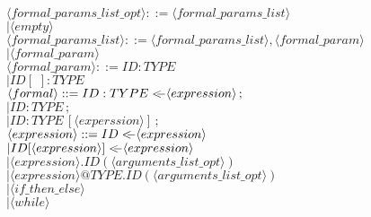 \documentclass[11pt]{article}
\begin{document}
\begin{enumerate}
\color{black}
$\langle formal\_params\_list\_opt\rangle  ::= \langle formal\_params\_list\rangle$\\
                          \hspace*{5.2cm}$|   \langle empty\rangle$\\

$\langle formal\_params\_list\rangle      ::= \langle formal\_params\_list\rangle , \langle formal\_param\rangle$\\
                          \hspace*{4.5cm}$|   \langle formal\_param\rangle$\\

$\langle formal\_param\rangle            ::= ID : TYPE $\\
\color{blue}
                                \hspace*{3.45cm}$| ID[\,\,] : TYPE$\\
\color{black}
$\langle formal\rangle                  ::= ID : TYPE <\hspace{-0.25cm}- \langle expression\rangle\,;$\\
                          \hspace*{2.3cm}$|   ID : TYPE\,;$\\
            \color{blue}
            \hspace*{2.3cm}$|   ID : TYPE\,[\langle experssion\rangle]\,;$\\
    \color{black}
$\langle expression\rangle              ::= ID <\hspace{-0.25cm}- \langle expression\rangle $\\
                    \color{blue}
                           \hspace*{3.2cm}$| ID[\langle expression\rangle] <\hspace{-0.25cm}- \langle expression\rangle$\\
                    \color{black}
                          \hspace*{3.2cm}$|   \langle expression\rangle.ID( \langle arguments\_list\_opt\rangle )$\\
                          \hspace*{3.2cm}$|   \langle expression\rangle @TYPE.ID( \langle arguments\_list\_opt\rangle )$\\
                          \hspace*{3.2cm}$|   \langle if\_then\_else\rangle$\\
                          \hspace*{3.2cm}$|   \langle while\rangle $\\

\end{enumerate}
\end{document}
